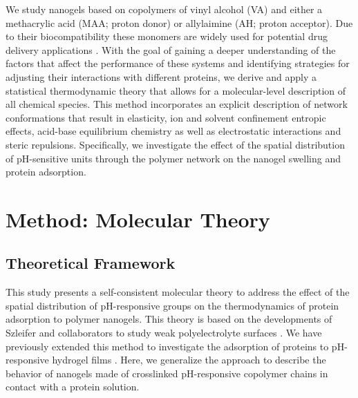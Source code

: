 We study nanogels based on copolymers of vinyl alcohol (VA) and either a methacrylic acid (MAA; proton donor) or allylaimine (AH; proton acceptor).
Due to their biocompatibility these monomers are widely used for potential drug delivery applications .
With the goal of gaining a deeper understanding of the factors that affect the performance of these systems and identifying strategies for adjusting their interactions with different proteins, we derive and apply a statistical thermodynamic theory that allows for a molecular-level description of all chemical species.
This method incorporates an explicit description of network conformations that result in elasticity, ion and solvent confinement entropic effects, acid-base equilibrium chemistry as well as electrostatic interactions and steric repulsions.
Specifically, we investigate the effect of the spatial distribution of pH-sensitive units through the polymer network on the nanogel swelling and protein adsorption.















\section{Method: Molecular Theory}



\subsection{Theoretical Framework}\label{sect:theory}


 

This study presents a self-consistent molecular theory to address the effect of the spatial distribution of pH-responsive groups on the thermodynamics of  protein adsorption to polymer nanogels.
This theory is based on the developments of Szleifer and collaborators to study weak polyelectrolyte surfaces .
We have previously extended this method to investigate the adsorption of proteins to pH-responsive hydrogel films .
Here, we generalize the approach to describe the behavior of nanogels made of crosslinked pH-responsive copolymer chains in contact with a protein solution.
 


